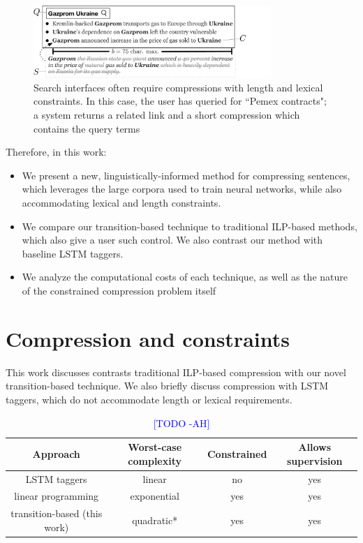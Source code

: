 \documentclass[11pt,a4paper]{article}
\newcommand{\ahcomment}[1]{\textcolor{blue}{[#1 -AH]}}
\begin{document}
\begin{figure}[htb!]
\includegraphics[width=9cm]{qf.pdf}
\caption{Search interfaces often require compressions with length and lexical constraints. In this case, the user has queried for ``Pemex contracts"; a system returns a related link and a short compression which contains the query terms}
\label{f:qf}
\end{figure}


Therefore, in this work:

\begin{itemize}
\item{We present a new, linguistically-informed method for compressing sentences, which leverages the large corpora used to train neural networks, while also accommodating lexical and length constraints.}
\item{We compare our transition-based technique to traditional ILP-based methods, which also give a user such control. We also contrast our method with baseline LSTM taggers.}
\item{We analyze the computational costs of each technique, as well as the nature of the constrained compression problem itself}
\end{itemize}


\section{Compression and constraints}

This work discusses contrasts traditional ILP-based compression with our novel transition-based technique. We also briefly discuss compression with LSTM taggers, which do not accommodate length or lexical requirements.

\begin{table}[htb!]
\begin{tabular}{cccc}
\textbf{Approach} & \textbf{Worst-case complexity} & \textbf{Constrained} & \textbf{Allows supervision} \\ \hline
LSTM taggers      & linear              & no     &    yes      \\   
linear programming              & exponential         & yes    &    yes   \\
transition-based (this work)       & quadratic*           & yes    &      yes   \\
\end{tabular}
\caption{\ahcomment{TODO}}
\end{table}
\end{document}
